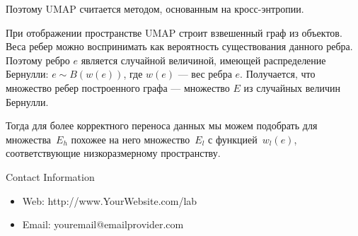 \documentclass[final]{beamer}
\newlength{\onecolwid}
\begin{document}
\begin{frame}[t]
\begin{columns}[t]
\begin{column}{\onecolwid}
Поэтому UMAP считается методом, основанным на кросс-энтропии.

При отображении пространстве UMAP строит взвешенный граф из объектов. Веса ребер можно воспринимать как вероятность существования данного ребра. Поэтому ребро $e$ является случайной величиной, имеющей распределение Бернулли: $e \sim B(w(e))$, где $w(e)$ --- вес ребра $e$. Получается, что множество ребер построенного графа --- множество $E$ из случайных величин Бернулли.

Тогда для более корректного переноса данных мы можем подобрать для множества~$E_h$ похожее на него множество~$E_l$ с функцией~$w_l(e)$, соответствующие низкоразмерному пространству.







\begin{alertblock}{Contact Information}

\begin{itemize}
\item Web: http://www.YourWebsite.com/lab
\item Email: youremail@emailprovider.com
\end{itemize}

\end{alertblock}


\end{column} %

\end{columns} %

\end{frame} %
\end{document}
